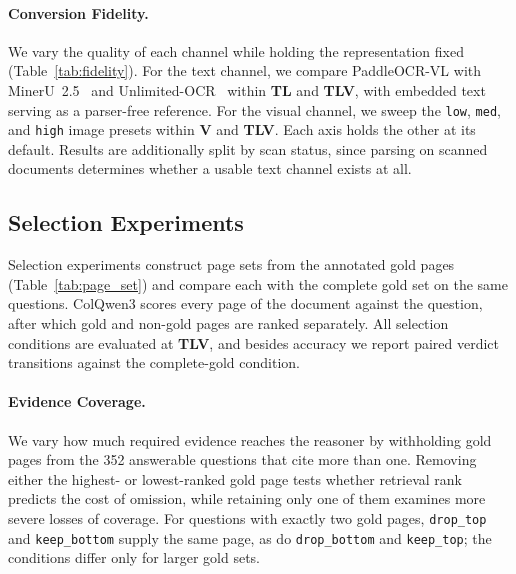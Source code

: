 

\paragraph{Conversion Fidelity.} We vary the quality of each channel while holding the representation fixed (Table~\ref{tab:fidelity}). For the text channel, we compare PaddleOCR-VL with MinerU~2.5~\citep{niu2026mineru2} and Unlimited-OCR~\citep{yin2026unlimited} within \textbf{TL} and \textbf{TLV}, with embedded text serving as a parser-free reference. For the visual channel, we sweep the \texttt{low}, \texttt{med}, and \texttt{high} image presets within \textbf{V} and \textbf{TLV}. Each axis holds the other at its default. Results are additionally split by scan status, since parsing on scanned documents determines whether a usable text channel exists at all.

\subsection{Selection Experiments}
\label{sec:emp_selection}

Selection experiments construct page sets from the annotated gold pages (Table~\ref{tab:page_set}) and compare each with the complete gold set on the same questions. ColQwen3 scores every page of the document against the question, after which gold and non-gold pages are ranked separately. All selection conditions are evaluated at \textbf{TLV}, and besides accuracy we report paired verdict transitions against the complete-gold condition.



\paragraph{Evidence Coverage.} We vary how much required evidence reaches the reasoner by withholding gold pages from the 352 answerable questions that cite more than one. Removing either the highest- or lowest-ranked gold page tests whether retrieval rank predicts the cost of omission, while retaining only one of them examines more severe losses of coverage. For questions with exactly two gold pages, \texttt{drop\_top} and \texttt{keep\_bottom} supply the same page, as do \texttt{drop\_bottom} and \texttt{keep\_top}; the conditions differ only for larger gold sets.

